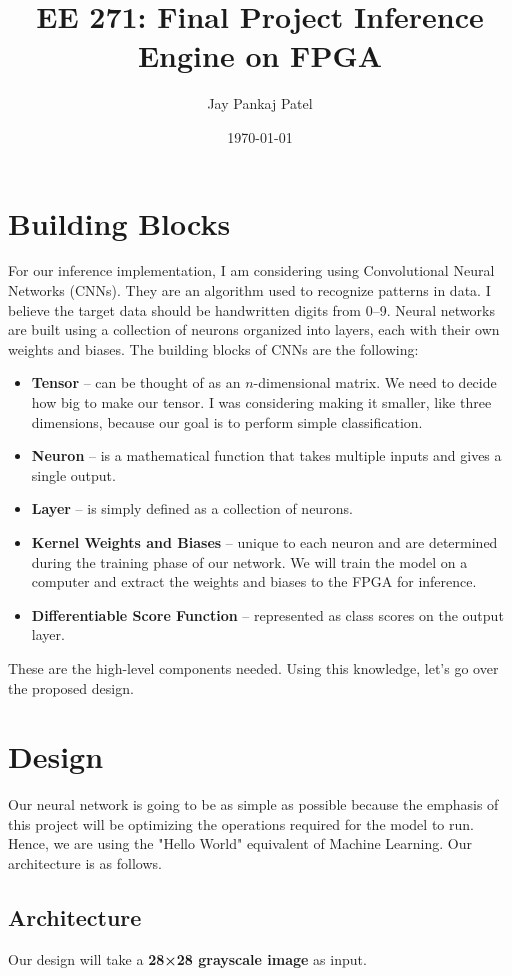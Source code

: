 \documentclass{article}
\title{EE 271: Final Project Inference Engine on FPGA}
\author{Jay Pankaj Patel}
\date{\today}
\begin{document}
\maketitle
\tableofcontents
\newpage

\section{Building Blocks}
For our inference implementation, I am considering using Convolutional Neural Networks (CNNs). They are an algorithm used to recognize patterns in data. I believe the target data should be handwritten digits from 0--9. Neural networks are built using a collection of neurons organized into layers, each with their own weights and biases. The building blocks of CNNs are the following:
\begin{itemize}
  \item \textbf{Tensor} -- can be thought of as an $n$-dimensional matrix. We need to decide how big to make our tensor. I was considering making it smaller, like three dimensions, because our goal is to perform simple classification.
  \item \textbf{Neuron} -- is a mathematical function that takes multiple inputs and gives a single output.
  \item \textbf{Layer} -- is simply defined as a collection of neurons.
  \item \textbf{Kernel Weights and Biases} -- unique to each neuron and are determined during the training phase of our network. We will train the model on a computer and extract the weights and biases to the FPGA for inference.
  \item \textbf{Differentiable Score Function} -- represented as class scores on the output layer.
\end{itemize}
These are the high-level components needed. Using this knowledge, let’s go over the proposed design.

\section{Design}
Our neural network is going to be as simple as possible because the emphasis of this project will be optimizing the operations required for the model to run. Hence, we are using the "Hello World" equivalent of Machine Learning. Our architecture is as follows. 

\subsection{Architecture}
Our design will take a \textbf{28×28 grayscale image} as input.
\end{document}
